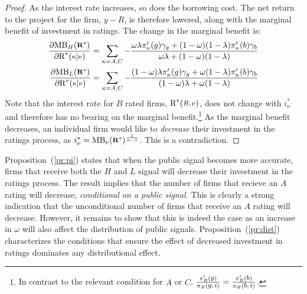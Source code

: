 \documentclass[notitlepage]{article}
\begin{document}
\begin{proof}
As the interest rate increases, so does the borrowing cost. The net return to the project for the firm, $y-R$, is therefore lowered, along with the marginal benefit of investment in ratings. The change in the marginal benefit is:
\begin{align}
\frac{\partial \textup{MB}_{H}(\medmath{\mathbf{R^{*}}})}{\partial \textup{R}^{*}(\medmath{\kappa}|\medmath{\nu})} &=\sum_{\kappa = A,C} -\frac{\omega\lambda\pi_{\kappa}'(g)\gamma_{g}+(1-\omega)(1-\lambda)\pi_{\kappa}'(b)\gamma_b}{\omega\lambda + (1-\omega)(1-\lambda)}\\
\frac{\partial \textup{MB}_{L}(\medmath{\mathbf{R^{*}}})}{\partial \textup{R}^{*}(\medmath{\kappa}|\medmath{\nu})} &=\sum_{\kappa = A,C} -\frac{(1-\omega)\lambda\pi_{\kappa}'(g)\gamma_{g}+\omega(1-\lambda)\pi_{\kappa}'(b)\gamma_b}{(1-\omega)\lambda + \omega(1-\lambda)}
\end{align}
Note that the interest rate for $B$ rated firms, $\textup{R}^{*}(\medmath{B,\nu})$, does not change with $i^{*}_{\nu}$ and therefore has no bearing on the marginal benefit.\footnote{In contrast to the relevant condition for $A$ or $C$, $\frac{\pi_{B}'(\medmath{g})}{\pi_{B}(\medmath{g,i})}=\frac{\pi_{B}'(\medmath{b})}{\pi_{B}(\medmath{b,i})}$.} As the marginal benefit decreases, an individual firm would like to \emph{decrease} their investment in the ratings process, as $i^{*}_{\nu}=\textup{MB}_{\nu}(\medmath{\mathbf{R^{*}}})^{\frac{1}{\alpha-1}}$. This is a contradiction.
\end{proof}

Proposition~(\ref{pr:pi}) states that when the public signal becomes more accurate, firms that receive both the $H$ and $L$ signal will decrease their investment in the ratings process.  The result implies that the number of firms that recieve an $A$ rating will decrease, \emph{conditional on a public signal.} This is clearly a strong indication that the unconditional number of firms that receive an $A$ rating will decrease. However, it remains to show that this is indeed the case as an increase in $\omega$ will also affect the distribution of public signals. Proposition~(\ref{pr:dist}) characterizes the conditions that ensure the effect of decreased investment in ratings dominates any distributional effect.
\end{document}
